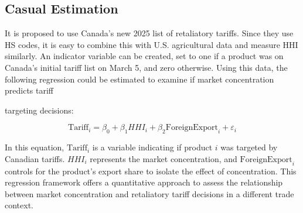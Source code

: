 \documentclass[AEJ]{AEA}
\begin{document}




\subsection{Casual Estimation}	
	It is proposed to use Canada's new 2025 list of retaliatory tariffs.  Since they use HS codes, it is easy to combine this with U.S. agricultural data and measure HHI similarly.  An indicator variable can be created, set to one if a product was on Canada's initial tariff list on March 5, and zero otherwise.  Using this data, the following regression could be estimated to examine if market concentration predicts tariff
	
	
	targeting decisions:
	
	\[
	\text{Tariff}_i = \beta_0 + \beta_1 HHI_i + \beta_2 \text{ForeignExport}_i + \varepsilon_i
	\]
	
	In this equation, \(\text{Tariff}_i\) is a variable indicating if product \(i\) was targeted by Canadian tariffs.  \(HHI_i\) represents the market concentration, and \(\text{ForeignExport}_i\) controls for the product's export share to isolate the effect of concentration.  This regression framework offers a quantitative approach to assess the relationship between market concentration and retaliatory tariff decisions in a different trade context.

	
	
	
\end{document}
